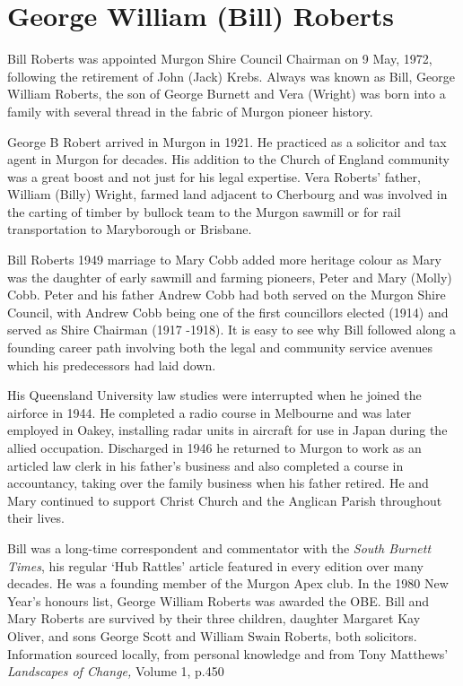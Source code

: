 \hypertarget{george-william-bill-roberts}{%
\section{George William (Bill) Roberts}\label{george-william-bill-roberts}}

Bill Roberts was appointed Murgon Shire Council Chairman on 9 May, 1972, following the retirement of John (Jack) Krebs. Always was known as Bill, George William Roberts, the son of George Burnett and Vera (Wright) was born into a family with several thread in the fabric of Murgon pioneer history.

George B Robert arrived in Murgon in 1921. He practiced as a solicitor and tax agent in Murgon for decades. His addition to the Church of England community was a great boost and not just for his legal expertise. Vera Roberts' father, William (Billy) Wright, farmed land adjacent to Cherbourg and was involved in the carting of timber by bullock team to the Murgon sawmill or for rail transportation to Maryborough or Brisbane.

Bill Roberts 1949 marriage to Mary Cobb added more heritage colour as Mary was the daughter of early sawmill and farming pioneers, Peter and Mary (Molly) Cobb. Peter and his father Andrew Cobb had both served on the Murgon Shire Council, with Andrew Cobb being one of the first councillors elected (1914) and served as Shire Chairman (1917 -1918). It is easy to see why Bill followed along a founding career path involving both the legal and community service avenues which his predecessors had laid down.

His Queensland University law studies were interrupted when he joined the airforce in 1944. He completed a radio course in Melbourne and was later employed in Oakey, installing radar units in aircraft for use in Japan during the allied occupation. Discharged in 1946 he returned to Murgon to work as an articled law clerk in his father's business and also completed a course in accountancy, taking over the family business when his father retired. He and Mary continued to support Christ Church and the Anglican Parish throughout their lives.

Bill was a long-time correspondent and commentator with the \emph{South Burnett Times}, his regular `Hub Rattles' article featured in every edition over many decades. He was a founding member of the Murgon Apex club. In the 1980 New Year's honours list, George William Roberts was awarded the OBE. Bill and Mary Roberts are survived by their three children, daughter Margaret Kay Oliver, and sons George Scott and William Swain Roberts, both solicitors. Information sourced locally, from personal knowledge and from Tony Matthews' \emph{Landscapes of Change,} Volume 1, p.450

